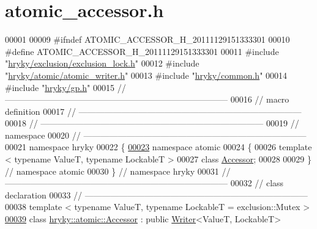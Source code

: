 \hypertarget{atomic__accessor_8h_source}{\section{atomic\-\_\-accessor.\-h}
}

\begin{DoxyCode}
00001 
00009 \textcolor{preprocessor}{#ifndef ATOMIC\_ACCESSOR\_H\_20111129151333301}
00010 \textcolor{preprocessor}{}\textcolor{preprocessor}{#define ATOMIC\_ACCESSOR\_H\_20111129151333301}
00011 \textcolor{preprocessor}{}\textcolor{preprocessor}{#include "\hyperlink{exclusion__lock_8h}{hryky/exclusion/exclusion_lock.h}"}
00012 \textcolor{preprocessor}{#include "\hyperlink{atomic__writer_8h}{hryky/atomic/atomic_writer.h}"}
00013 \textcolor{preprocessor}{#include "\hyperlink{common_8h}{hryky/common.h}"}
00014 \textcolor{preprocessor}{#include "\hyperlink{gp_8h}{hryky/gp.h}"}
00015 \textcolor{comment}{//
      ------------------------------------------------------------------------------}
00016 \textcolor{comment}{// macro definition}
00017 \textcolor{comment}{//
      ------------------------------------------------------------------------------}
00018 \textcolor{comment}{//
      ------------------------------------------------------------------------------}
00019 \textcolor{comment}{// namespace}
00020 \textcolor{comment}{//
      ------------------------------------------------------------------------------}
00021 \textcolor{keyword}{namespace }hryky
00022 \{
\hypertarget{atomic__accessor_8h_source_l00023}{}\hyperlink{namespacehryky_1_1atomic}{00023} \textcolor{keyword}{namespace }atomic
00024 \{
00026     \textcolor{keyword}{template} < \textcolor{keyword}{typename} ValueT, \textcolor{keyword}{typename} LockableT >
00027     \textcolor{keyword}{class }\hyperlink{classhryky_1_1atomic_1_1_accessor}{Accessor};
00028     
00029 \} \textcolor{comment}{// namespace atomic}
00030 \} \textcolor{comment}{// namespace hryky}
00031 \textcolor{comment}{//
      ------------------------------------------------------------------------------}
00032 \textcolor{comment}{// class declaration}
00033 \textcolor{comment}{//
      ------------------------------------------------------------------------------}
00038 \textcolor{comment}{}\textcolor{keyword}{template} < \textcolor{keyword}{typename} ValueT, \textcolor{keyword}{typename} LockableT = exclusion::Mutex >
\hypertarget{atomic__accessor_8h_source_l00039}{}\hyperlink{classhryky_1_1atomic_1_1_accessor}{00039} \textcolor{keyword}{class }\hyperlink{classhryky_1_1atomic_1_1_accessor}{hryky::atomic::Accessor} : \textcolor{keyword}{public} \hyperlink{classhryky_1_1atomic_1_1_writer}{Writer}<ValueT, LockableT>

\end{DoxyCode}
